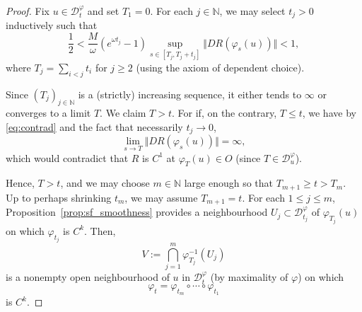 \documentclass[a4paper, 12pt, oneside, reqno, notitlepage]{amsart}
\theoremstyle{plain}
\theoremstyle{definition}
\theoremstyle{remark}
\begin{document}
\begin{proof}
    Fix $u \in \mathcal{D}_t^\varphi$ and set $T_1 = 0$.
    For each $j \in \mathbb{N}$, we may select $t_j > 0$ inductively such that
    \begin{equation}
       \frac{1}{2} < \frac{M}{\omega} \left( e^{\omega t_j} - 1 \right) \sup_{s \in [T_j,T_j+t_j]} \Vert DR (\varphi_s(u)) \Vert < 1,
       \label{eq:contrad}
    \end{equation}
    where $T_j = \sum_{i < j} t_i$ for $j \geq 2$
    (using the axiom of dependent choice).    

    Since $(T_j)_{j\in \mathbb{N}}$ is a (strictly) increasing sequence, it either tends to $\infty$ or converges to a limit $T$.
    We claim $T > t$.
    For if, on the contrary, $T \leq t$, we have by \eqref{eq:contrad} and the fact that necessarily $t_j \to 0$,
    \begin{displaymath}
        \lim_{s\to T}\Vert DR (\varphi_s(u)) \Vert  = \infty,
    \end{displaymath}
    which would contradict that $R$ is $C^1$ at $\varphi_T(u) \in O$ (since $T \in \mathcal{D}^\varphi_u$).

    

    Hence, $T >t$, and we may choose $m \in \mathbb{N}$ large enough so that $T_{m+1} \geq t > T_m$.
    Up to perhaps shrinking $t_m$, we may assume $T_{m+1} = t$.
    For each $ 1 \leq j \leq m$, Proposition~\ref{prop:sf_smoothness} provides a neighbourhood $U_j \subset \mathcal{D}^\varphi_{t_j}$ of $\varphi_{T_j}(u)$ on which $\varphi_{t_j}$ is $C^k$.
    Then,
    \begin{displaymath}
        V :=\bigcap_{j =1}^{m} \varphi_{T_j}^{-1}(U_j)
    \end{displaymath}
    is a nonempty open neighbourhood of $u$ in $\mathcal{D}^\varphi_t$ (by maximality of $\varphi$) on which
    \begin{displaymath}
        \varphi_t = \varphi_{t_m} \circ \cdots \circ \varphi_{t_1}
    \end{displaymath}
    is $C^k$.
\end{proof}
\end{document}
